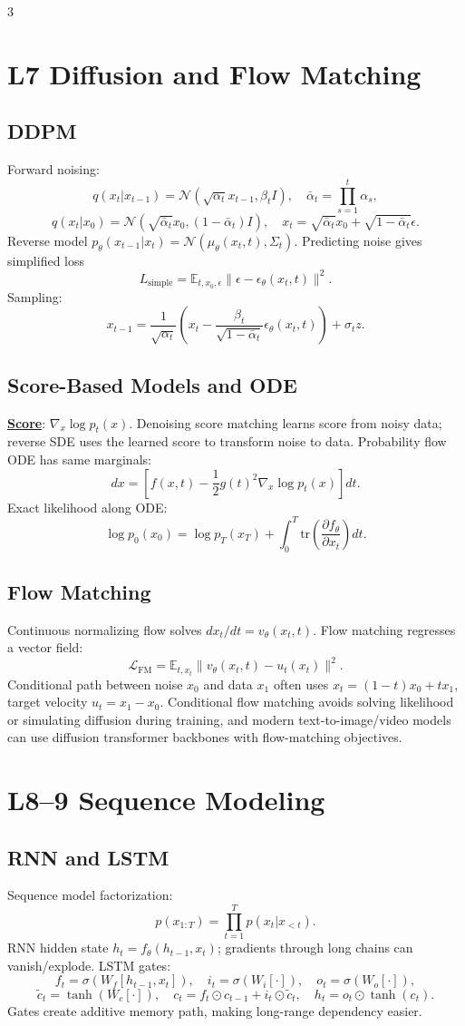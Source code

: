 \documentclass{article}
\newcommand{\lowterm}[1]{\textbf{\underline{#1}}}
\newcommand{\E}{\mathbb{E}}
\newcommand{\N}{\mathcal{N}}
\begin{document}
\begin{multicols*}{3}
\section{L7 Diffusion and Flow Matching}
\subsection{DDPM}
Forward noising:
\[
q(x_t|x_{t-1})=\N(\sqrt{\alpha_t}x_{t-1},\beta_tI),\quad
\bar\alpha_t=\prod_{s=1}^t\alpha_s,
\]
\[
q(x_t|x_0)=\N(\sqrt{\bar\alpha_t}x_0,(1-\bar\alpha_t)I),
\quad x_t=\sqrt{\bar\alpha_t}x_0+\sqrt{1-\bar\alpha_t}\epsilon.
\]
Reverse model $p_\theta(x_{t-1}|x_t)=\N(\mu_\theta(x_t,t),\Sigma_t)$. Predicting noise gives simplified loss
\[
L_{\text{simple}}=\E_{t,x_0,\epsilon}\|\epsilon-\epsilon_\theta(x_t,t)\|^2.
\]
Sampling:
\[
x_{t-1}=\frac{1}{\sqrt{\alpha_t}}\left(x_t-\frac{\beta_t}{\sqrt{1-\bar\alpha_t}}\epsilon_\theta(x_t,t)\right)+\sigma_t z.
\]

\subsection{Score-Based Models and ODE}
\lowterm{Score}: $\nabla_x\log p_t(x)$. Denoising score matching learns score from noisy data; reverse SDE uses the learned score to transform noise to data. Probability flow ODE has same marginals:
\[
dx=\left[f(x,t)-\frac12g(t)^2\nabla_x\log p_t(x)\right]dt.
\]
Exact likelihood along ODE:
\[
\log p_0(x_0)=\log p_T(x_T)+\int_0^T \mathrm{tr}\left(\frac{\partial f_\theta}{\partial x_t}\right)dt.
\]

\subsection{Flow Matching}
Continuous normalizing flow solves $dx_t/dt=v_\theta(x_t,t)$. Flow matching regresses a vector field:
\[
\mathcal L_{\text{FM}}=\E_{t,x_t}\|v_\theta(x_t,t)-u_t(x_t)\|^2.
\]
Conditional path between noise $x_0$ and data $x_1$ often uses $x_t=(1-t)x_0+tx_1$, target velocity $u_t=x_1-x_0$. Conditional flow matching avoids solving likelihood or simulating diffusion during training, and modern text-to-image/video models can use diffusion transformer backbones with flow-matching objectives.

\section{L8--9 Sequence Modeling}
\subsection{RNN and LSTM}
Sequence model factorization:
\[
p(x_{1:T})=\prod_{t=1}^T p(x_t|x_{<t}).
\]
RNN hidden state $h_t=f_\theta(h_{t-1},x_t)$; gradients through long chains can vanish/explode. LSTM gates:
\[
f_t=\sigma(W_f[h_{t-1},x_t]),\quad i_t=\sigma(W_i[\cdot]),\quad o_t=\sigma(W_o[\cdot]),
\]
\[
\tilde c_t=\tanh(W_c[\cdot]),\quad c_t=f_t\odot c_{t-1}+i_t\odot\tilde c_t,\quad h_t=o_t\odot\tanh(c_t).
\]
Gates create additive memory path, making long-range dependency easier.


\end{multicols*}
\end{document}
